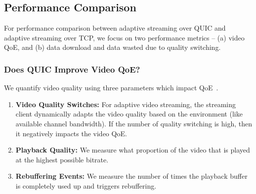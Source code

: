 \subsection{Performance Comparison}
For performance comparison between adaptive streaming over QUIC and adaptive streaming over TCP, we focus on two performance metrics -- (a) video QoE, and (b) data download and data wasted due to quality switching. 

\subsubsection{Does QUIC Improve Video QoE?}
We quantify video quality using three parameters which impact QoE~\cite{balachandran2012quest}.
\begin{enumerate}[leftmargin=*]
	\item\textbf{Video Quality Switches:} For adaptive video streaming, the streaming client dynamically adapts the video quality based on the environment (like available channel bandwidth). If the number of quality switching is high, then it negatively impacts the video QoE. 
	\item\textbf{Playback Quality:} We measure what proportion of the video that is played at the highest possible bitrate. 
	\item\textbf{Rebuffering Events:} We measure the number of times the playback buffer is completely used up and triggers rebuffering.
\end{enumerate}

